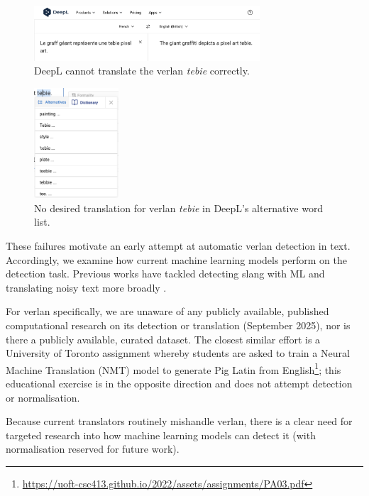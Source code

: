 \documentclass[12pt]{article}
\begin{document}
\begin{figure}[H]
\centering
\includegraphics[width=0.75\textwidth]{figures/deepl_verlan.png}
\caption{\label{fig:deepl_verlan}DeepL cannot translate the verlan \textit{tebie} correctly.}
\end{figure}

\begin{figure}[H]
\centering
\includegraphics[width=0.28\textwidth]{figures/deepl_alt_text.png}
\caption{\label{fig:deepl_alt_text}No desired translation for verlan \textit{tebie} in DeepL's alternative word list.}
\end{figure}

These failures motivate an early attempt at automatic verlan detection in text. Accordingly, we examine how current machine learning models perform on the detection task. Previous works have tackled detecting slang with ML and translating noisy text more broadly \cite{pei2019slang, michel2018mtnt}.

For verlan specifically, we are unaware of any publicly available, published computational research on its detection or translation (September 2025), nor is there a publicly available, curated dataset. The closest similar effort is a University of Toronto assignment whereby students are asked to train a Neural Machine Translation (NMT) model to generate Pig Latin from English\footnote{\url{https://uoft-csc413.github.io/2022/assets/assignments/PA03.pdf}}; this educational exercise is in the opposite direction and does not attempt detection or normalisation.

Because current translators routinely mishandle verlan, there is a clear need for targeted research into how machine learning models can detect it (with normalisation reserved for future work).
\end{document}
